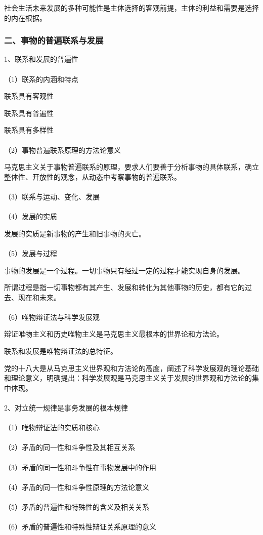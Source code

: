 \documentclass{ctexart}
\begin{document}
社会生活未来发展的多种可能性是主体选择的客观前提，主体的利益和需要是选择的内在根据。

\subsubsection{二、事物的普遍联系与发展}
1、联系和发展的普遍性
\\\\
（1）联系的内涵和特点

联系具有客观性

联系具有普遍性

联系具有多样性
\\\\
（2）事物普遍联系原理的方法论意义

马克思主义关于事物普遍联系的原理，要求人们要善于分析事物的具体联系，确立整体性、开放性的观念，从动态中考察事物的普遍联系。
\\\\
（3）联系与运动、变化、发展
\\\\
（4）发展的实质

发展的实质是新事物的产生和旧事物的灭亡。
\\\\
（5）发展与过程

事物的发展是一个过程。一切事物只有经过一定的过程才能实现自身的发展。

所谓过程是指一切事物都有其产生、发展和转化为其他事物的历史，都有它的过去、现在和未来。
\\\\
（6）唯物辩证法与科学发展观

辩证唯物主义和历史唯物主义是马克思主义最根本的世界论和方法论。

联系和发展是唯物辩证法的总特征。

党的十八大是从马克思主义世界观和方法论的高度，阐述了科学发展观的理论基础和理论意义，明确提出：科学发展观是马克思主义关于发展的世界观和方法论的集中体现。
\\\\

2、对立统一规律是事务发展的根本规律
\\\\
（1）唯物辩证法的实质和核心
\\\\
（2）矛盾的同一性和斗争性及其相互关系
\\\\
（3）矛盾的同一性和斗争性在事物发展中的作用
\\\\
（4）矛盾的同一性和斗争性原理的方法论意义
\\\\
（5）矛盾的普遍性和特殊性的含义及相关关系
\\\\
（6）矛盾的普遍性和特殊性辩证关系原理的意义
\\\\
\end{document}
